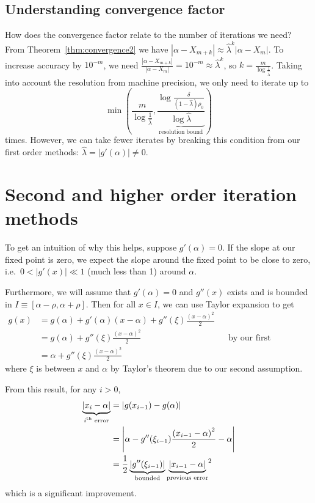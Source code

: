 \documentclass[12pt,letterpaper,DIV=11]{scrartcl}
\theoremstyle{plain}
\theoremstyle{definition}
\theoremstyle{remark}
\begin{document}
\subsection{Understanding convergence factor}
How does the convergence factor relate to the number of iterations we need?
From Theorem~\ref{thm:convergence2} we have $|\alpha - X_{m + k}| \approx \hat{\lambda}^k |\alpha - X_m|$.
To increase accuracy by $10^{-m}$, we need $\frac{|\alpha - X_{m + k}|}{|\alpha - X_m|} = 10^{-m} \approx \hat{\lambda}^k$, so $k = \frac{m}{\log \frac{1}{\hat{\lambda}}}$.
Taking into account the resolution from machine precision, we only need to iterate up to \begin{displaymath}
  \min\left( \frac{m}{\log \frac{1}{\hat{\lambda}}}, \underbrace{\frac{\log \frac{\delta}{(1 - \hat{\lambda}) \rho_0}}{\log \hat{\lambda}}}_\text{resolution bound} \right)
\end{displaymath} times.
However, we can take fewer iterates by breaking this condition from our first order methods: $\hat{\lambda} = |g'(\alpha)| \neq 0$.

\section{Second and higher order iteration methods}
To get an intuition of why this helps, suppose $g'(\alpha) = 0$.
If the slope at our fixed point is zero, we expect the slope around the fixed point to be close to zero, i.e.\ $0 < |g'(x)| \ll 1$ (much less than 1) around $\alpha$.

Furthermore, we will assume that $g'(\alpha) = 0$ and $g''(x)$ exists and is bounded in $I \equiv [\alpha - \rho, \alpha + \rho]$.
Then for all $x \in I$, we can use Taylor expansion to get \begin{align*}
  g(x) &= g(\alpha) + g'(\alpha)(x - \alpha) + g''(\xi) \frac{{(x - \alpha)}^2}{2} \\
       &= g(\alpha) + g''(\xi) \frac{{(x - \alpha)}^2}{2} && \text{by our first assumption} \\
       &= \alpha + g''(\xi) \frac{{(x - \alpha)}^2}{2}
\end{align*} where $\xi$ is between $x$ and $\alpha$ by Taylor's theorem due to our second assumption.

From this result, for any $i > 0$, \begin{align*}
  \underbrace{|x_i - \alpha|}_\text{$i$\textsuperscript{th} error} &= |g(x_{i - 1}) - g(\alpha)| \\
                                                                   &= \left\lvert \alpha - g''(\xi_{i - 1}) \frac{{(x_{i - 1} - \alpha)}^2}{2} - \alpha \right\rvert \\
                                                                   &= \frac{1}{2} \underbrace{\left\vert g''(\xi_{i - 1}) \right\vert}_\text{bounded} {\underbrace{\left\vert x_{i - 1} - \alpha \right\vert}_\text{previous error}}^2
\end{align*} which is a significant improvement.
\end{document}
